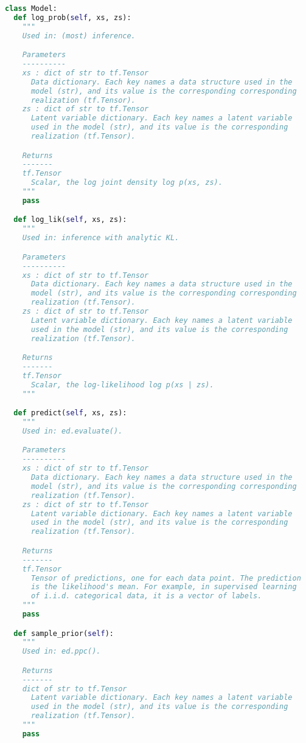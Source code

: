 \begin{lstlisting}[language=Python]
class Model:
  def log_prob(self, xs, zs):
    """
    Used in: (most) inference.

    Parameters
    ----------
    xs : dict of str to tf.Tensor
      Data dictionary. Each key names a data structure used in the
      model (str), and its value is the corresponding corresponding
      realization (tf.Tensor).
    zs : dict of str to tf.Tensor
      Latent variable dictionary. Each key names a latent variable
      used in the model (str), and its value is the corresponding
      realization (tf.Tensor).

    Returns
    -------
    tf.Tensor
      Scalar, the log joint density log p(xs, zs).
    """
    pass

  def log_lik(self, xs, zs):
    """
    Used in: inference with analytic KL.

    Parameters
    ----------
    xs : dict of str to tf.Tensor
      Data dictionary. Each key names a data structure used in the
      model (str), and its value is the corresponding corresponding
      realization (tf.Tensor).
    zs : dict of str to tf.Tensor
      Latent variable dictionary. Each key names a latent variable
      used in the model (str), and its value is the corresponding
      realization (tf.Tensor).

    Returns
    -------
    tf.Tensor
      Scalar, the log-likelihood log p(xs | zs).
    """

  def predict(self, xs, zs):
    """
    Used in: ed.evaluate().

    Parameters
    ----------
    xs : dict of str to tf.Tensor
      Data dictionary. Each key names a data structure used in the
      model (str), and its value is the corresponding corresponding
      realization (tf.Tensor).
    zs : dict of str to tf.Tensor
      Latent variable dictionary. Each key names a latent variable
      used in the model (str), and its value is the corresponding
      realization (tf.Tensor).

    Returns
    -------
    tf.Tensor
      Tensor of predictions, one for each data point. The prediction
      is the likelihood's mean. For example, in supervised learning
      of i.i.d. categorical data, it is a vector of labels.
    """
    pass

  def sample_prior(self):
    """
    Used in: ed.ppc().

    Returns
    -------
    dict of str to tf.Tensor
      Latent variable dictionary. Each key names a latent variable
      used in the model (str), and its value is the corresponding
      realization (tf.Tensor).
    """
    pass


\end{lstlisting}
